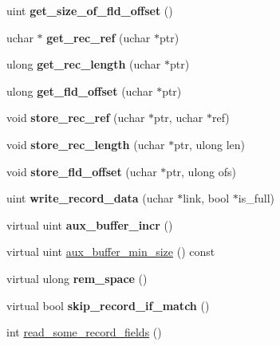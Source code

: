 \begin{DoxyCompactItemize}
uint {\bfseries get\+\_\+size\+\_\+of\+\_\+fld\+\_\+offset} ()
\item 
\mbox{\label{classJOIN__CACHE_aef7d5ccc0f04c2c3e3107bfb5029d83b}} 
uchar $\ast$ {\bfseries get\+\_\+rec\+\_\+ref} (uchar $\ast$ptr)
\item 
\mbox{\label{classJOIN__CACHE_affaaf4cead12696ab71541f92c101549}} 
ulong {\bfseries get\+\_\+rec\+\_\+length} (uchar $\ast$ptr)
\item 
\mbox{\label{classJOIN__CACHE_ad9ec3f29f7d7a1d965713f7ee6ad433b}} 
ulong {\bfseries get\+\_\+fld\+\_\+offset} (uchar $\ast$ptr)
\item 
\mbox{\label{classJOIN__CACHE_aae06643b31aeae3edf8dd1d995aa210d}} 
void {\bfseries store\+\_\+rec\+\_\+ref} (uchar $\ast$ptr, uchar $\ast$ref)
\item 
\mbox{\label{classJOIN__CACHE_a4fd245ce093975c3958e1171eb504315}} 
void {\bfseries store\+\_\+rec\+\_\+length} (uchar $\ast$ptr, ulong len)
\item 
\mbox{\label{classJOIN__CACHE_aedd006ee992d43fb217780aaf0a14bcf}} 
void {\bfseries store\+\_\+fld\+\_\+offset} (uchar $\ast$ptr, ulong ofs)
\item 
uint {\bfseries write\+\_\+record\+\_\+data} (uchar $\ast$link, bool $\ast$is\+\_\+full)
\item 
\mbox{\label{classJOIN__CACHE_a5ab6de3276d2d9b53e1cac722460a542}} 
virtual uint {\bfseries aux\+\_\+buffer\+\_\+incr} ()
\item 
virtual uint \mbox{\hyperlink{classJOIN__CACHE_a22f1df0156fa6d176df6d6e6d4b84916}{aux\+\_\+buffer\+\_\+min\+\_\+size}} () const
\item 
\mbox{\label{classJOIN__CACHE_a4793b67844966b1aa59a04fea7cdd645}} 
virtual ulong {\bfseries rem\+\_\+space} ()
\item 
virtual bool {\bfseries skip\+\_\+record\+\_\+if\+\_\+match} ()
\item 
int \mbox{\hyperlink{group__Query__Optimizer_ga20c8bd509fba4099611e8a7b01c115d8}{read\+\_\+some\+\_\+record\+\_\+fields}} ()
\item 

\end{DoxyCompactItemize}
